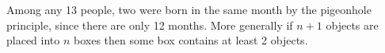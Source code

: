 Among any 13 people, two were born in the same month by the pigeonhole principle, since there are only 12 months.
More generally if $n + 1$ objects are placed into $n$ boxes then some box contains at least 2 objects.